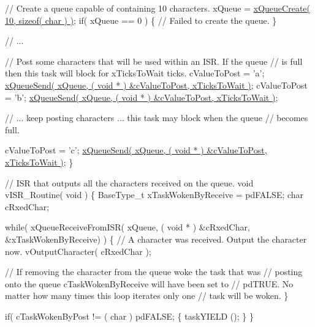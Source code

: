 \begin{DoxyPre} // Create a queue capable of containing 10 characters.
 xQueue = \hyperlink{vendor_2ceedling_2plugins_2freertos_2src_2freertos_2include_2queue_8h_aeb858b824bd74a934ea7ebb81af2a6bb}{xQueueCreate( 10, sizeof( char ) )};
 if( xQueue == 0 )
 \{
     // Failed to create the queue.
 \}\end{DoxyPre}



\begin{DoxyPre} // ...\end{DoxyPre}



\begin{DoxyPre} // Post some characters that will be used within an ISR.  If the queue
 // is full then this task will block for xTicksToWait ticks.
 cValueToPost = 'a';
 \hyperlink{externals_2freertos_2include_2queue_8h_af7eb49d3249351176992950d9185abe9}{xQueueSend( xQueue, ( void * ) &cValueToPost, xTicksToWait )};
 cValueToPost = 'b';
 \hyperlink{externals_2freertos_2include_2queue_8h_af7eb49d3249351176992950d9185abe9}{xQueueSend( xQueue, ( void * ) &cValueToPost, xTicksToWait )};\end{DoxyPre}



\begin{DoxyPre} // ... keep posting characters ... this task may block when the queue
 // becomes full.\end{DoxyPre}



\begin{DoxyPre} cValueToPost = 'c';
 \hyperlink{externals_2freertos_2include_2queue_8h_af7eb49d3249351176992950d9185abe9}{xQueueSend( xQueue, ( void * ) &cValueToPost, xTicksToWait )};
\}\end{DoxyPre}



\begin{DoxyPre}// ISR that outputs all the characters received on the queue.
void vISR\_Routine( void )
\{
BaseType\_t xTaskWokenByReceive = pdFALSE;
char cRxedChar;\end{DoxyPre}



\begin{DoxyPre} while( xQueueReceiveFromISR( xQueue, ( void * ) &cRxedChar, &xTaskWokenByReceive) )
 \{
     // A character was received.  Output the character now.
     vOutputCharacter( cRxedChar );\end{DoxyPre}



\begin{DoxyPre}     // If removing the character from the queue woke the task that was
     // posting onto the queue cTaskWokenByReceive will have been set to
     // pdTRUE.  No matter how many times this loop iterates only one
     // task will be woken.
 \}\end{DoxyPre}



\begin{DoxyPre} if( cTaskWokenByPost != ( char ) pdFALSE;
 \{
     taskYIELD ();
 \}
\}
\end{DoxyPre}
 